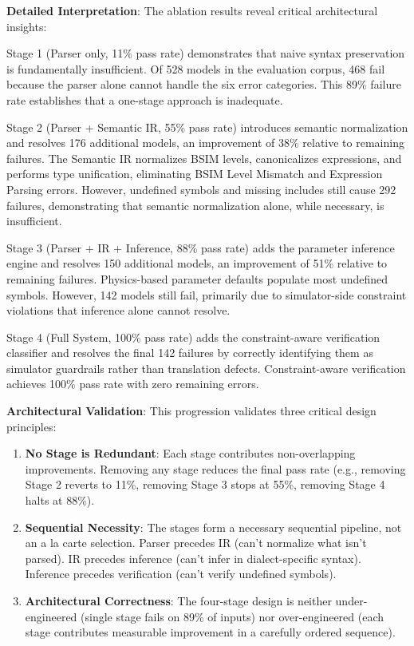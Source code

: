 \documentclass[conference]{IEEEtran}
\begin{document}
\textbf{Detailed Interpretation}: The ablation results reveal critical architectural insights:

Stage 1 (Parser only, 11\% pass rate) demonstrates that naive syntax preservation is fundamentally insufficient. Of 528 models in the evaluation corpus, 468 fail because the parser alone cannot handle the six error categories. This 89\% failure rate establishes that a one-stage approach is inadequate.

Stage 2 (Parser + Semantic IR, 55\% pass rate) introduces semantic normalization and resolves 176 additional models, an improvement of 38\% relative to remaining failures. The Semantic IR normalizes BSIM levels, canonicalizes expressions, and performs type unification, eliminating BSIM Level Mismatch and Expression Parsing errors. However, undefined symbols and missing includes still cause 292 failures, demonstrating that semantic normalization alone, while necessary, is insufficient.

Stage 3 (Parser + IR + Inference, 88\% pass rate) adds the parameter inference engine and resolves 150 additional models, an improvement of 51\% relative to remaining failures. Physics-based parameter defaults populate most undefined symbols. However, 142 models still fail, primarily due to simulator-side constraint violations that inference alone cannot resolve.

Stage 4 (Full System, 100\% pass rate) adds the constraint-aware verification classifier and resolves the final 142 failures by correctly identifying them as simulator guardrails rather than translation defects. Constraint-aware verification achieves 100\% pass rate with zero remaining errors.

\textbf{Architectural Validation}: This progression validates three critical design principles:
\begin{enumerate}
\item \textbf{No Stage is Redundant}: Each stage contributes non-overlapping improvements. Removing any stage reduces the final pass rate (e.g., removing Stage 2 reverts to 11\%, removing Stage 3 stops at 55\%, removing Stage 4 halts at 88\%).

\item \textbf{Sequential Necessity}: The stages form a necessary sequential pipeline, not an a la carte selection. Parser precedes IR (can't normalize what isn't parsed). IR precedes inference (can't infer in dialect-specific syntax). Inference precedes verification (can't verify undefined symbols).

\item \textbf{Architectural Correctness}: The four-stage design is neither under-engineered (single stage fails on 89\% of inputs) nor over-engineered (each stage contributes measurable improvement in a carefully ordered sequence).
\end{enumerate}
\end{document}
